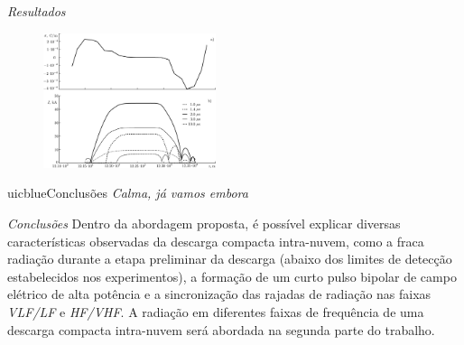 \documentclass{beamer}
\begin{document}
\begin{frame}{\textit{Resultados}}

	\begin{figure}
		\centering
		\includegraphics[width=0.45\textwidth]{imagens_artigo/17.png}
	\end{figure}

\end{frame}

\begin{chapter}{uicblue}{Conclusões}
\textit{Calma, já vamos embora}
\end{chapter}
\begin{frame}{\textit{Conclusões}}
	 Dentro da abordagem proposta, é possível explicar diversas características observadas da descarga compacta intra-nuvem, como a fraca radiação durante a etapa preliminar da descarga (abaixo dos limites de detecção estabelecidos nos experimentos), a formação de um curto pulso bipolar de campo elétrico de alta potência e a sincronização das rajadas de radiação nas faixas \textit{VLF/LF} e \textit{HF/VHF}. A radiação em diferentes faixas de frequência de uma descarga compacta intra-nuvem será abordada na segunda parte do trabalho.
\end{frame}
\backmatter
\end{document}
